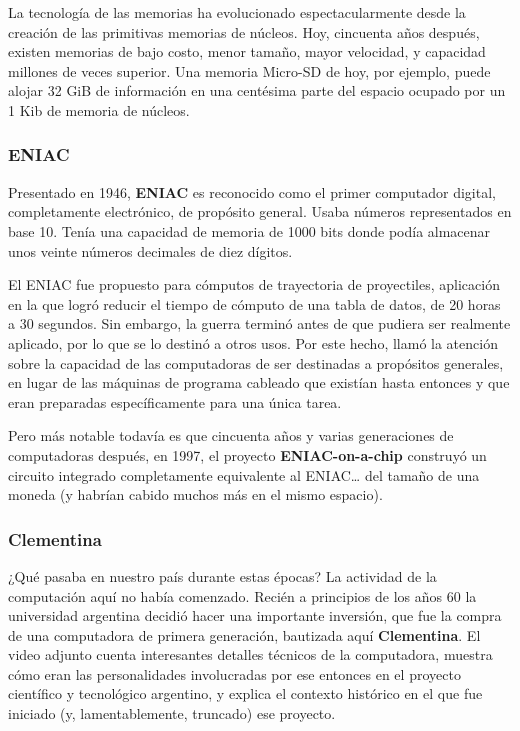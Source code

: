 \documentclass[spanish,a4paper,]{article}
\begin{document}
La tecnología de las memorias ha evolucionado espectacularmente desde la
creación de las primitivas memorias de núcleos. Hoy, cincuenta años
después, existen memorias de bajo costo, menor tamaño, mayor velocidad,
y capacidad millones de veces superior. Una memoria Micro-SD de hoy, por
ejemplo, puede alojar 32 GiB de información en una centésima parte del
espacio ocupado por un 1 Kib de memoria de núcleos.

\hypertarget{eniac}{%
\subsubsection{ENIAC}\label{eniac}}

Presentado en 1946, \textbf{ENIAC} es reconocido como el primer
computador digital, completamente electrónico, de propósito general.
Usaba números representados en base 10. Tenía una capacidad de memoria
de 1000 bits donde podía almacenar unos veinte números decimales de diez
dígitos.

El ENIAC fue propuesto para cómputos de trayectoria de proyectiles,
aplicación en la que logró reducir el tiempo de cómputo de una tabla de
datos, de 20 horas a 30 segundos. Sin embargo, la guerra terminó antes
de que pudiera ser realmente aplicado, por lo que se lo destinó a otros
usos. Por este hecho, llamó la atención sobre la capacidad de las
computadoras de ser destinadas a propósitos generales, en lugar de las
máquinas de programa cableado que existían hasta entonces y que eran
preparadas específicamente para una única tarea.

Pero más notable todavía es que cincuenta años y varias generaciones de
computadoras después, en 1997, el proyecto \textbf{ENIAC-on-a-chip}
construyó un circuito integrado completamente equivalente al
ENIAC\ldots{} del tamaño de una moneda (y habrían cabido muchos más en
el mismo espacio).

\hypertarget{clementina}{%
\subsubsection{Clementina}\label{clementina}}

¿Qué pasaba en nuestro país durante estas épocas? La actividad de la
computación aquí no había comenzado. Recién a principios de los años 60
la universidad argentina decidió hacer una importante inversión, que fue
la compra de una computadora de primera generación, bautizada aquí
\textbf{Clementina}. El video adjunto cuenta interesantes detalles
técnicos de la computadora, muestra cómo eran las personalidades
involucradas por ese entonces en el proyecto científico y tecnológico
argentino, y explica el contexto histórico en el que fue iniciado (y,
lamentablemente, truncado) ese proyecto.
\end{document}
